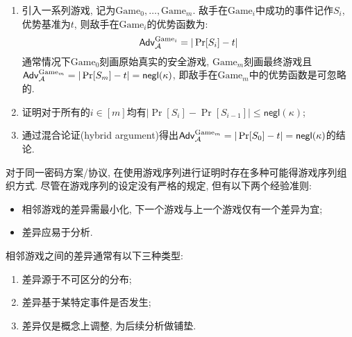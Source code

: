 \begin{enumerate}
\item 引入一系列游戏, 记为$\text{Game}_0, \dots, \text{Game}_m$. 
    敌手在$\text{Game}_i$中成功的事件记作$S_i$, 优势基准为$t$, 则敌手在$\text{Game}_i$的优势函数为: 
    \begin{equation*}
        \mathsf{Adv}_\mathcal{A}^{\text{Game}_i} = |\Pr[S_i] - t| 
    \end{equation*}
    通常情况下$\text{Game}_0$刻画原始真实的安全游戏, 
    $\text{Game}_m$刻画最终游戏且$\mathsf{Adv}_\mathcal{A}^{\text{Game}_m} = |\Pr[S_m]-t| = \mathsf{negl}(\kappa)$, 
    即敌手在$\text{Game}_m$中的优势函数是可忽略的. 

\item 证明对于所有的$i \in [m]$均有$|\Pr[S_i] - \Pr[S_{i-1}]| \leq \mathsf{negl}(\kappa)$; 

\item 通过混合论证(hybrid argument)得出$\mathsf{Adv}_\mathcal{A}^{\text{Game}_m} = |\Pr[S_0]-t| = \mathsf{negl}(\kappa)$的结论.   
\end{enumerate}

对于同一密码方案/协议, 在使用游戏序列进行证明时存在多种可能得游戏序列组织方式. 
尽管在游戏序列的设定没有严格的规定, 但有以下两个经验准则:
\begin{itemize}
    \item 相邻游戏的差异需最小化, 下一个游戏与上一个游戏仅有一个差异为宜; 
    \item 差异应易于分析. 
\end{itemize}

相邻游戏之间的差异通常有以下三种类型: 
\begin{enumerate}
    \item 差异源于不可区分的分布; 
    \item 差异基于某特定事件是否发生; 
    \item 差异仅是概念上调整, 为后续分析做铺垫. 
\end{enumerate}

